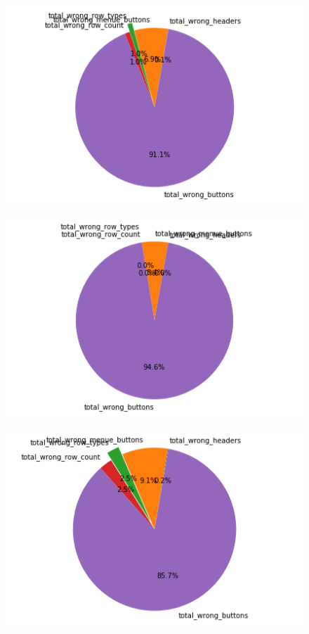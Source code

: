 \documentclass[pdftex,a4paper,halfparskip, article]{scrartcl}
\begin{document}
\begin{figure}
\centering
\begin{minipage}{.33\textwidth}
  \centering
  \includegraphics[width=1\linewidth]{predictions_bin18_2_total_error_types_pie_chart}
  \label{fig:fehler_gesamt_bin18_2}
\end{minipage}%
\begin{minipage}{.33\textwidth}
  \centering
  \includegraphics[width=1\linewidth]{predictions_bin18_2_excluded_p80_error_types_pie_chart}
  \label{fig:fehler_beste80_bin18_2}
\end{minipage}
\begin{minipage}{.33\textwidth}
  \centering
   \includegraphics[width=1\linewidth]{predictions_bin18_2_p80_error_types_pie_chart}

\end{minipage}
\end{figure}
\end{document}
